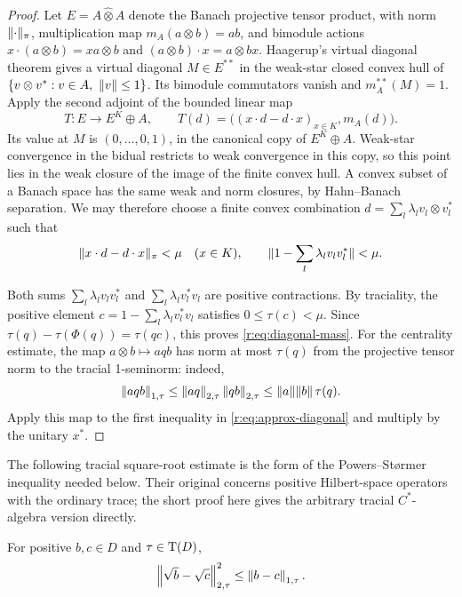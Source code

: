 \begin{proof}
Let \(E=A\widehat\otimes A\) denote the Banach projective tensor product,
with norm \(\lVert\cdot\rVert_\pi\), multiplication map
\(m_A(a\otimes b)=ab\), and bimodule actions
\(x\cdot(a\otimes b)=xa\otimes b\) and
\((a\otimes b)\cdot x=a\otimes bx\).
Haagerup's virtual diagonal theorem
\cite[Theorem~3.1]{Haa83} gives a virtual diagonal \(M\in E^{**}\) in
the weak-star closed convex hull of
\(\{v\otimes v^*:v\in A,\ \lVert v\rVert\leq1\}\).
Its bimodule commutators vanish and \(m_A^{**}(M)=1\).
Apply the second adjoint of the bounded linear map
\[
 T:E\longrightarrow E^K\oplus A,\qquad
 T(d)=\big((x\cdot d-d\cdot x)_{x\in K},m_A(d)\big).
\]
Its value at \(M\) is \((0,\ldots,0,1)\), in the canonical copy of
\(E^K\oplus A\). Weak-star convergence in the bidual restricts to weak
convergence in this copy, so this point lies in the weak closure of the
image of the finite convex hull. A convex subset of a Banach space has the
same weak and norm closures, by Hahn--Banach separation. We may therefore choose a finite
convex combination \(d=\sum_l\lambda_l v_l\otimes v_l^*\) such that
\begin{equation}\label{r:eq:approx-diagonal}
 \lVert x\cdot d-d\cdot x\rVert_\pi<\mu\quad(x\in K),\qquad
 \lVert1-\sum_l\lambda_l v_lv_l^*\rVert<\mu.
\end{equation}

Both sums \(\sum_l\lambda_l v_lv_l^*\) and
\(\sum_l\lambda_l v_l^*v_l\) are positive contractions. By traciality,
the positive element \(c=1-\sum_l\lambda_l v_l^*v_l\) satisfies
\(0\leq\tau(c)<\mu\). Since
\(\tau(q)-\tau(\Phi(q))=\tau(qc)\), this proves
\eqref{r:eq:diagonal-mass}.
For the centrality estimate, the map
\(a\otimes b\mapsto aqb\) has norm at most \(\tau(q)\) from the
projective tensor norm to the tracial 1-seminorm: indeed,
\[
 \left\|aqb\right\|_{1,\tau}
 \leq\left\|aq\right\|_{2,\tau}\left\|qb\right\|_{2,\tau}
 \leq\lVert a\rVert\lVert b\rVert\,\tau(q).
\]
Apply this map to the first inequality in \eqref{r:eq:approx-diagonal}
and multiply by the unitary \(x^*\).
\end{proof}

The following tracial square-root estimate is the form of the
Powers--St\o rmer inequality needed below. Their original
\cite[Lemma~4.1]{PowersStormer1970} concerns positive Hilbert-space
operators with the ordinary trace; the short proof here gives the
arbitrary tracial $C^*$-algebra version directly.

\begin{lemma}\label{r:weighted:square-root}
For positive \(b,c\in D\) and \(\tau\in\operatorname T(D)\),
\[
 \left\|\sqrt b-\sqrt c\right\|_{2,\tau}^2
 \leq\left\|b-c\right\|_{1,\tau}.
\]
\end{lemma}

